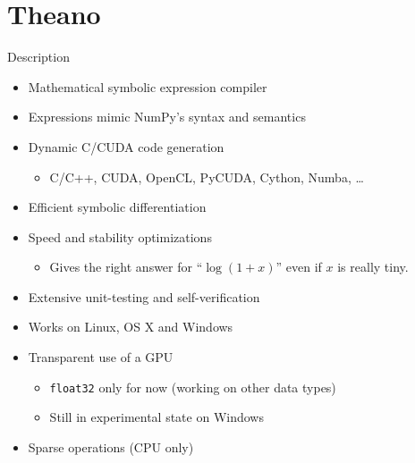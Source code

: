 \documentclass[utf8x,xcolor=pdftex,dvipsnames,table]{beamer}
\begin{document}
\section{Theano}
\begin{frame}
  \tableofcontents[currentsection]
\end{frame}

\begin{frame}{Description}
  \begin{itemize}
    \item Mathematical symbolic expression compiler
    \item Expressions mimic NumPy's syntax and semantics
    \item Dynamic C/CUDA code generation
    \begin{itemize}
      \item C/C++, CUDA, OpenCL, PyCUDA, Cython, Numba, \ldots
    \end{itemize}
    \item Efficient symbolic differentiation
    \item Speed and stability optimizations
    \begin{itemize}
      \item Gives the right answer for ``$\log (1 + x)$'' even if $x$ is really tiny.
    \end{itemize}
    \item Extensive unit-testing and self-verification
    \item Works on Linux, OS X and Windows
    \item Transparent use of a GPU
    \begin{itemize}
      \item {\tt float32} only for now (working on other data types)
      \item Still in experimental state on Windows
    \end{itemize}

    \item Sparse operations (CPU only)
  \end{itemize}
\end{frame}
\end{document}
